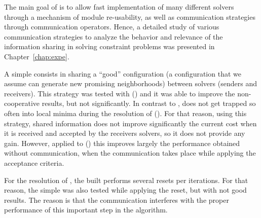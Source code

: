 
The main goal of \posl{} is to allow fast implementation of many different solvers through a mechanism of module re-usability, as well as communication strategies through communication operators. Hence, a detailed study of various communication strategies to analyze the behavior and relevance of the information sharing in solving constraint problems was presented in Chapter~\ref{chap:expe}.

A simple \commstr{} consists in sharing a ``good'' configuration (a configuration that we assume can generate new promising neighborhoods) between solvers (senders and receivers). This strategy was tested with \sgp{} (\SGP) and it was able to improve the non-cooperative results, but not significantly. In contrast to \SGP, \posl{} does not get trapped so often into local minima during the resolution of \nqp{} (\NQP{}). For that reason, using this strategy, shared information does not improve significantly the current cost when it is received and accepted by the receivers solvers, so it does not provide any gain. However, applied to \carrp{} (\CARRP) this \commstr{} improves largely the performance obtained without communication, when the communication takes place while applying the acceptance criteria.

For the resolution of \CARRP{}, the built \as{} performs several resets per iterations. For that reason, the simple \commstr{} was also tested while applying the reset, but with not good results. The reason is that the communication interferes with the proper performance of this important step in the algorithm.


